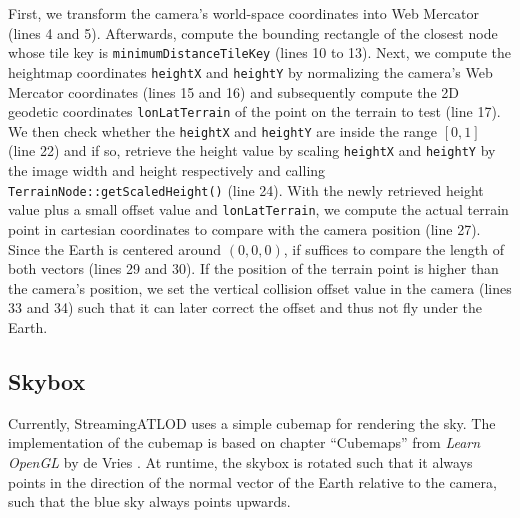 First, we transform the camera's world-space coordinates into Web Mercator (lines 4 and 5).
Afterwards, compute the bounding rectangle of the closest node whose tile key is \texttt{minimumDistanceTileKey} (lines 10 to 13).
Next, we compute the heightmap coordinates \texttt{heightX} and \texttt{heightY} 
by normalizing the camera's Web Mercator coordinates (lines 15 and 16) and subsequently compute the 
2D geodetic coordinates \texttt{lonLatTerrain} of the point on the terrain to test (line 17).
We then check whether the \texttt{heightX} and \texttt{heightY} are inside the range $[0,1]$ (line 22)
and if so, retrieve the height value by scaling \texttt{heightX} and \texttt{heightY} by 
the image width and height respectively and calling \texttt{TerrainNode::getScaledHeight()} (line 24).
With the newly retrieved height value plus a small offset value and \texttt{lonLatTerrain}, we compute the actual terrain
point in cartesian coordinates to compare with the camera position (line 27).
Since the Earth is centered around $(0,0,0)$, if suffices to compare the length of both vectors (lines 29 and 30).
If the position of the terrain point is higher than the camera's position, we set the vertical collision offset value in 
the camera (lines 33 and 34) such that it can later correct the offset and thus not fly under the Earth.

\subsection{Skybox}
Currently, StreamingATLOD uses a simple 
cubemap for rendering the sky. The implementation of the cubemap 
is based on chapter ``Cubemaps'' from \textit{Learn OpenGL} by de Vries \cite{learnopengl}.
At runtime, the skybox is rotated such that it always points in the direction of the normal vector of the 
Earth relative to the camera, such that the blue sky always points upwards.

